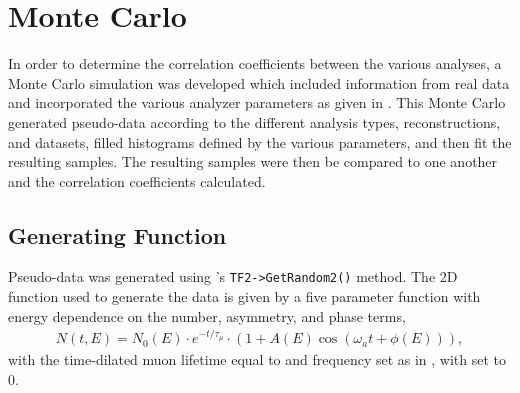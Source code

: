 
\graphicspath{{Body/Figures/EvW/}{Body/Figures/GoodnessOfFit/}}

\section{Monte Carlo}


In order to determine the correlation coefficients between the various analyses, a Monte Carlo simulation was developed which included information from real data and incorporated the various analyzer parameters as given in . This Monte Carlo generated pseudo-data according to the different analysis types, reconstructions, and datasets, filled histograms defined by the various parameters, and then fit the resulting samples. The resulting samples were then be compared to one another and the correlation coefficients calculated.


\subsection{Generating Function}

Pseudo-data was generated using \ROOT's \texttt{TF2->GetRandom2()} method. The 2D function used to generate the data is given by a five parameter function with energy dependence on the number, asymmetry, and phase terms,
\begin{align}
    N(t, E) = N_{0}(E) \cdot e^{-t/\tau_{\mu}} \cdot (1 + A(E) \cos{(\omega_{a}t + \phi(E))}),
\label{eq:2dfunc}
\end{align}
with the time-dilated muon lifetime \taumu equal to  and \gmtwo frequency \wa set as in , with \R set to 0. 


